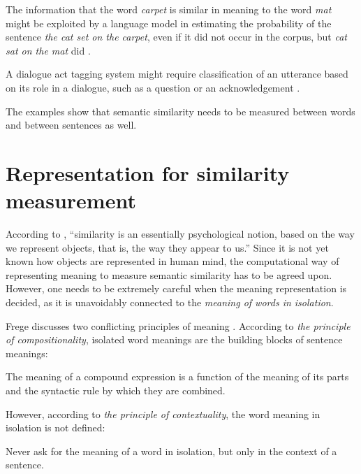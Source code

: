 The information that the word \textit{carpet} is similar in meaning to the word \textit{mat} might be exploited by a language model in estimating the probability of the sentence \textit{the cat set on the carpet}, even if it did not occur in the corpus, but \textit{cat sat on the mat} did \cite{bengio2006}.

A dialogue act tagging system might require classification of an utterance based on its role in a dialogue, such as a question or an acknowledgement \cite{kalchbrenner-blunsom:2013:CVSC}.

The examples show that semantic similarity needs to be measured between words and between sentences as well.

\section{Representation for similarity measurement}
\label{sec:word-meaning}

According to , ``similarity is an essentially psychological notion, based on the way we represent objects, that is, the way they appear to us.'' Since it is not yet known how objects are represented in human mind, the computational way of representing meaning to measure semantic similarity has to be agreed upon. However, one needs to be extremely careful when the meaning representation is decided, as it is unavoidably connected to the \emph{meaning of words in isolation}.


Frege discusses two conflicting principles of meaning \cite{Janssen2001}. According to \emph{the principle of compositionality}, isolated word meanings are the building blocks of sentence meanings:
\begin{displayquote}
The meaning of a compound expression is a function of the meaning of its parts and the syntactic rule by which they are combined.
\end{displayquote}
%
However, according to \emph{the principle of contextuality}, the word meaning in isolation is not defined:
\begin{displayquote}
Never ask for the meaning of a word in isolation, but only in the context of a sentence.
\end{displayquote}

